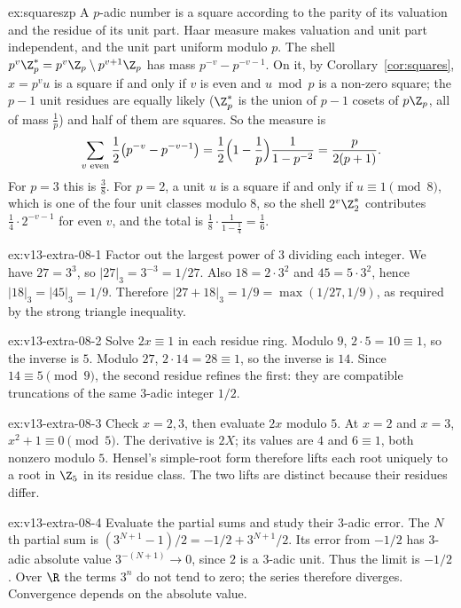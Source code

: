 \begin{solution}{ex:squareszp}
\idea A $p$-adic number is a square according to the parity of its valuation and the residue of its unit part. Haar measure makes valuation and unit part
independent, and the unit part uniform modulo $p$.
\writeup The shell $p^v\Z_p^*=p^v\Z_p\setminus p^{v+1}\Z_p$ has mass $p^{-v}-p^{-v-1}$. On it, by Corollary~\ref{cor:squares}, $x=p^vu$ is a square if and only if $v$ is even and
$u\bmod p$ is a non-zero square; the $p-1$ unit residues are equally likely ($\Z_p^*$ is the union of $p-1$ cosets of $p\Z_p$, all of mass $\frac1p$) and half of them
are squares. So the measure is
\[\sum_{v\text{ even}}\frac12\bigl(p^{-v}-p^{-v-1}\bigr)=\frac12\Bigl(1-\frac1p\Bigr)\frac1{1-p^{-2}}=\frac p{2(p+1)}.\]
For $p=3$ this is $\frac38$. For $p=2$, a unit $u$ is a square if and only if $u\equiv1\pmod8$, which is one of the four unit classes modulo $8$, so the shell $2^v\Z_2^*$ contributes
$\frac14\cdot2^{-v-1}$ for even $v$, and the total is $\frac18\cdot\frac1{1-\frac14}=\frac16$.
\end{solution}

\begin{solution}{ex:v13-extra-08-1}
\idea Factor out the largest power of $3$ dividing each integer.
\writeup We have $27=3^3$, so $|27|_3=3^{-3}=1/27$. Also $18=2\cdot3^2$ and $45=5\cdot3^2$, hence $|18|_3=|45|_3=1/9$. Therefore $|27+18|_3=1/9=\max(1/27,1/9)$, as required by the strong triangle inequality.
\end{solution}

\begin{solution}{ex:v13-extra-08-2}
\idea Solve $2x\equiv1$ in each residue ring.
\writeup Modulo $9$, $2\cdot5=10\equiv1$, so the inverse is $5$. Modulo $27$, $2\cdot14=28\equiv1$, so the inverse is $14$. Since $14\equiv5\pmod9$, the second residue refines the first: they are compatible truncations of the same $3$-adic integer $1/2$.
\end{solution}

\begin{solution}{ex:v13-extra-08-3}
\idea Check $x=2,3$, then evaluate $2x$ modulo $5$.
\writeup At $x=2$ and $x=3$, $x^2+1\equiv0\pmod5$. The derivative is $2X$; its values are $4$ and $6\equiv1$, both nonzero modulo $5$. Hensel's simple-root form therefore lifts each root uniquely to a root in $\Z_5$ in its residue class. The two lifts are distinct because their residues differ.
\end{solution}

\begin{solution}{ex:v13-extra-08-4}
\idea Evaluate the partial sums and study their $3$-adic error.
\writeup The $N$th partial sum is $(3^{N+1}-1)/2=-1/2+3^{N+1}/2$. Its error from $-1/2$ has $3$-adic absolute value $3^{-(N+1)}\to0$, since $2$ is a $3$-adic unit. Thus the limit is $-1/2$. Over $\R$ the terms $3^n$ do not tend to zero; the series therefore diverges. Convergence depends on the absolute value.
\end{solution}

